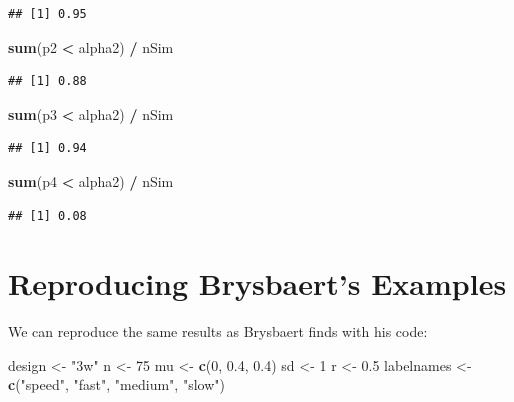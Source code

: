 \documentclass[]{book}
\newenvironment{Shaded}{\begin{snugshade}}{\end{snugshade}}
\newcommand{\DecValTok}[1]{\textcolor[rgb]{0.00,0.00,0.81}{#1}}
\newcommand{\FloatTok}[1]{\textcolor[rgb]{0.00,0.00,0.81}{#1}}
\newcommand{\KeywordTok}[1]{\textcolor[rgb]{0.13,0.29,0.53}{\textbf{#1}}}
\newcommand{\NormalTok}[1]{#1}
\newcommand{\OperatorTok}[1]{\textcolor[rgb]{0.81,0.36,0.00}{\textbf{#1}}}
\newcommand{\StringTok}[1]{\textcolor[rgb]{0.31,0.60,0.02}{#1}}
\begin{document}
\begin{verbatim}
## [1] 0.95
\end{verbatim}

\begin{Shaded}
\begin{Highlighting}[]
\KeywordTok{sum}\NormalTok{(p2 }\OperatorTok{<}\StringTok{ }\NormalTok{alpha2) }\OperatorTok{/}\StringTok{ }\NormalTok{nSim}
\end{Highlighting}
\end{Shaded}

\begin{verbatim}
## [1] 0.88
\end{verbatim}

\begin{Shaded}
\begin{Highlighting}[]
\KeywordTok{sum}\NormalTok{(p3 }\OperatorTok{<}\StringTok{ }\NormalTok{alpha2) }\OperatorTok{/}\StringTok{ }\NormalTok{nSim}
\end{Highlighting}
\end{Shaded}

\begin{verbatim}
## [1] 0.94
\end{verbatim}

\begin{Shaded}
\begin{Highlighting}[]
\KeywordTok{sum}\NormalTok{(p4 }\OperatorTok{<}\StringTok{ }\NormalTok{alpha2) }\OperatorTok{/}\StringTok{ }\NormalTok{nSim}
\end{Highlighting}
\end{Shaded}

\begin{verbatim}
## [1] 0.08
\end{verbatim}

\hypertarget{reproducing-brysbaerts-examples}{%
\section{Reproducing Brysbaert's Examples}\label{reproducing-brysbaerts-examples}}

We can reproduce the same results as Brysbaert finds with his code:

\begin{Shaded}
\begin{Highlighting}[]
\NormalTok{design <-}\StringTok{ "3w"}
\NormalTok{n <-}\StringTok{ }\DecValTok{75}
\NormalTok{mu <-}\StringTok{ }\KeywordTok{c}\NormalTok{(}\DecValTok{0}\NormalTok{, }\FloatTok{0.4}\NormalTok{, }\FloatTok{0.4}\NormalTok{)}
\NormalTok{sd <-}\StringTok{ }\DecValTok{1}
\NormalTok{r <-}\StringTok{ }\FloatTok{0.5}
\NormalTok{labelnames <-}\StringTok{ }\KeywordTok{c}\NormalTok{(}\StringTok{"speed"}\NormalTok{, }\StringTok{"fast"}\NormalTok{, }\StringTok{"medium"}\NormalTok{, }\StringTok{"slow"}\NormalTok{)}
\end{Highlighting}
\end{Shaded}
\end{document}
